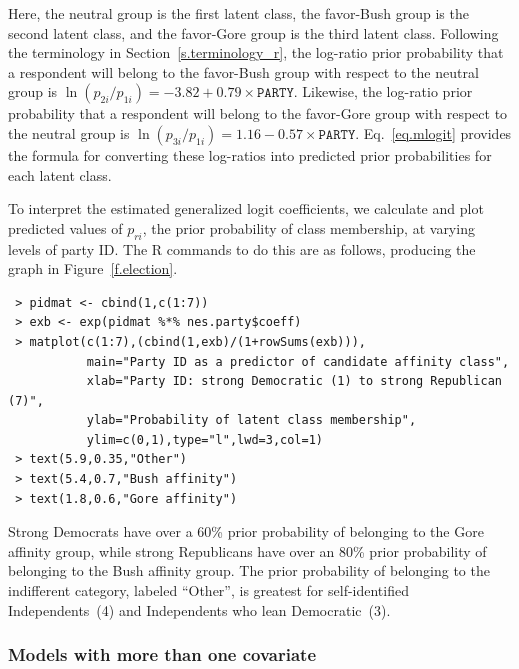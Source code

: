 \documentclass[letterpaper,12pt]{article}
\begin{document}
Here, the neutral group is the first latent class, the favor-Bush group is the second latent class, and the favor-Gore group is the third latent class. Following the terminology in Section~\ref{s.terminology_r}, the log-ratio prior probability that a respondent will belong to the favor-Bush group with respect to the neutral group is $ \ln( p_{2i} / p_{1i} ) = -3.82 + 0.79 \times \texttt{PARTY}$.  Likewise, the log-ratio prior probability that a respondent will belong to the favor-Gore group with respect to the neutral group is $ \ln( p_{3i} / p_{1i} ) =  1.16 - 0.57 \times \texttt{PARTY}$.  Eq.~\ref{eq.mlogit} provides the formula for converting these log-ratios into predicted prior probabilities for each latent class.

To interpret the estimated generalized logit coefficients, we calculate and plot predicted values of $p_{ri}$, the prior probability of class membership, at varying levels of party ID. The \textsf{R} commands to do this are as follows, producing the graph in Figure~\ref{f.election}.

\begin{verbatim}
 > pidmat <- cbind(1,c(1:7))
 > exb <- exp(pidmat %*% nes.party$coeff)
 > matplot(c(1:7),(cbind(1,exb)/(1+rowSums(exb))),
           main="Party ID as a predictor of candidate affinity class",
           xlab="Party ID: strong Democratic (1) to strong Republican (7)",
           ylab="Probability of latent class membership",
           ylim=c(0,1),type="l",lwd=3,col=1)
 > text(5.9,0.35,"Other")
 > text(5.4,0.7,"Bush affinity")
 > text(1.8,0.6,"Gore affinity")
\end{verbatim}

Strong Democrats have over a 60\% prior probability of belonging to the Gore affinity group, while strong Republicans have over an 80\% prior probability of belonging to the Bush affinity group.  The prior probability of belonging to the indifferent category, labeled ``Other'', is greatest for self-identified Independents~(4) and Independents who lean Democratic~(3).

\subsubsection{Models with more than one covariate}
\end{document}
